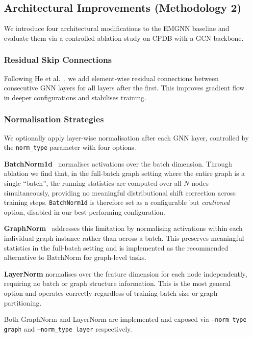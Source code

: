 \subsection{Architectural Improvements (Methodology 2)}

We introduce four architectural modifications to the EMGNN baseline and evaluate them
via a controlled ablation study on CPDB with a GCN backbone.

\subsubsection{Residual Skip Connections}
Following He et al.~\cite{resnet2016}, we add element-wise residual connections between
consecutive GNN layers for all layers after the first. This improves gradient flow in deeper
configurations and stabilises training.

\subsubsection{Normalisation Strategies}
We optionally apply layer-wise normalisation after each GNN layer, controlled by the
\texttt{norm\_type} parameter with four options.

\textbf{BatchNorm1d}~\cite{batchnorm2015} normalises activations over the batch
dimension. Through ablation we find that, in the full-batch graph setting where the entire
graph is a single ``batch'', the running statistics are computed over all $N$ nodes
simultaneously, providing no meaningful distributional shift correction across training
steps. \texttt{BatchNorm1d} is therefore set as a configurable but \emph{cautioned}
option, disabled in our best-performing configuration.

\textbf{GraphNorm}~\cite{graphnorm2021} addresses this limitation by normalising
activations within each individual graph instance rather than across a batch. This preserves
meaningful statistics in the full-batch setting and is implemented as the recommended
alternative to BatchNorm for graph-level tasks.

\textbf{LayerNorm} normalises over the feature dimension for each node independently,
requiring no batch or graph structure information. This is the most general option and
operates correctly regardless of training batch size or graph partitioning.

Both GraphNorm and LayerNorm are implemented and exposed via \texttt{--norm\_type graph}
and \texttt{--norm\_type layer} respectively.

